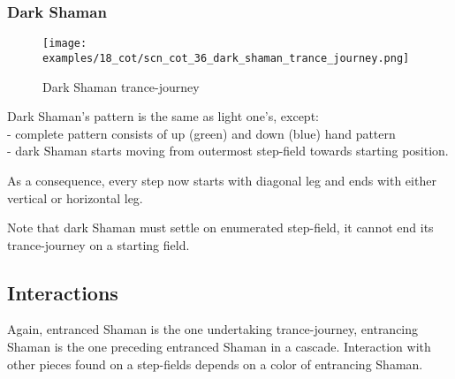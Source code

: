 \clearpage %

\subsubsection*{Dark Shaman}
\label{sec:Conquest of Tlalocan/Trance-journey/Movement/Dark Shaman}

\vspace*{-1.5\baselineskip}
\noindent
\begin{figure}[!h]
\texttt{[image: examples/18\_cot/scn\_cot\_36\_dark\_shaman\_trance\_journey.png]}
\vspace*{-1.4\baselineskip}
\caption{Dark Shaman trance-journey}
\label{fig:scn_cot_36_dark_shaman_trance_journey}
\end{figure}

\vspace*{-0.5\baselineskip}
Dark Shaman's pattern is the same as light one's, except: \\
- complete pattern consists of up (green) and down (blue) hand pattern \\
- dark Shaman starts moving from outermost step-field towards starting position.

As a consequence, every step now starts with diagonal leg and ends with either
vertical or horizontal leg.

Note that dark Shaman must settle on enumerated step-field, it cannot end its
trance-journey on a starting field.


\subsection*{Interactions}
\label{sec:Conquest of Tlalocan/Trance-journey/Interactions}

Again, entranced Shaman is the one undertaking trance-journey, entrancing Shaman
is the one preceding entranced Shaman in a cascade. Interaction with other pieces
found on a step-fields depends on a color of entrancing Shaman.

